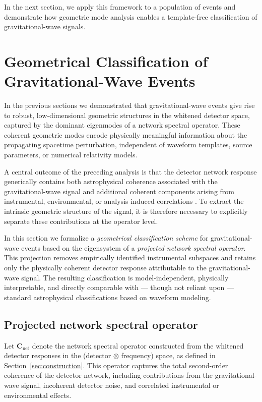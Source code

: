 \documentclass[11pt,a4paper]{article}
\begin{document}
In the next section, we apply this framework to a population of events and demonstrate
how geometric mode analysis enables a template-free classification of gravitational-wave signals.

\section{Geometrical Classification of Gravitational-Wave Events}
\label{sec:classification}

In the previous sections we demonstrated that gravitational-wave events give rise to
robust, low-dimensional geometric structures in the whitened detector space, captured by
the dominant eigenmodes of a network spectral operator.
These coherent geometric modes encode physically meaningful information about the
propagating spacetime perturbation, independent of waveform templates, source parameters,
or numerical relativity models.

A central outcome of the preceding analysis is that the detector network response
generically contains both astrophysical coherence associated with the gravitational-wave
signal and additional coherent components arising from instrumental, environmental, or
analysis-induced correlations \cite{Acernese2023VirgoDetCharTools}.
To extract the intrinsic geometric structure of the signal, it is therefore necessary
to explicitly separate these contributions at the operator level.

In this section we formalize a \emph{geometrical classification scheme} for
gravitational-wave events based on the eigensystem of a \emph{projected network spectral
operator}.
This projection removes empirically identified instrumental subspaces and retains only
the physically coherent detector response attributable to the gravitational-wave signal.
The resulting classification is model-independent, physically interpretable, and
directly comparable with --- though not reliant upon --- standard astrophysical
classifications based on waveform modeling.

\subsection{Projected network spectral operator}

Let $\mathbf{C}_{\mathrm{net}}$ denote the network spectral operator constructed from the whitened
detector responses in the (detector $\otimes$ frequency) space, as defined in Section~\ref{sec:construction}.
This operator captures the total second-order coherence of the detector network,
including contributions from the gravitational-wave signal, incoherent detector noise,
and correlated instrumental or environmental effects.
\end{document}
